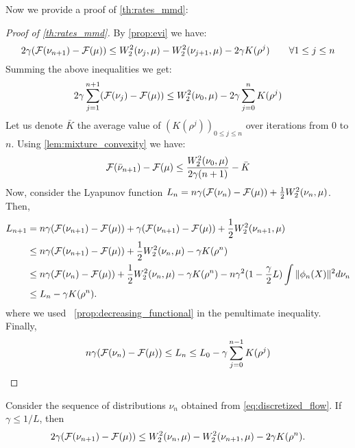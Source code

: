 Now we provide a proof of \cref{th:rates_mmd}:
\begin{proof}[Proof of \cref{th:rates_mmd}]\label{proof:th:rates_mmd}
	By \cref{prop:evi} we have:
	\[
	2\gamma({{\mathcal F}}(\nu_{n+1})-{{\mathcal F}}(\mu))
\leq 
W_2^2(\nu_j,\mu)-W_2^2(\nu_{j+1},\mu)-2\gamma K(\rho^j) \qquad \forall 1 \leq j\leq n 
	\]
	 Summing the above inequalities we get:
	\begin{align}
	2\gamma \sum_{j=1}^{n+1} ({{\mathcal F}}(\nu_{j}) - {{\mathcal F}}(\mu)) \leq W_2^2(\nu_0,\mu) - 2\gamma \sum_{j=0}^n K(\rho^j)
	\end{align}
	Let us denote $\bar{K}$ the average value of $(K(\rho^j))_{0\leq j \leq n}$ over iterations from $0$ to $n$. Using \cref{lem:mixture_convexity} we have:
	\begin{align}
	{{\mathcal F}}(\bar{\nu}_{n+1})-{{\mathcal F}}(\mu)\leq  \frac{W_2^2(\nu_0,\mu)}{2 \gamma (n+1)} -\bar{K}
	\end{align}
	Now, consider the Lyapunov function $L_n = n \gamma ({{\mathcal F}}(\nu_n) - {{\mathcal F}}(\mu)) + \frac12 W_2^2(\nu_n,\mu)$. Then,
	\begin{align*}
	L_{n+1} &= n\gamma({{\mathcal F}}(\nu_{n+1}) - {{\mathcal F}}(\mu)) + \gamma({{\mathcal F}}(\nu_{n+1}) - {{\mathcal F}}(\mu)) + \frac12 W_2^2(\nu_{n+1},\mu)\\
	&\leq n\gamma({{\mathcal F}}(\nu_{n+1}) - {{\mathcal F}}(\mu)) + \frac12 W_2^2(\nu_n,\mu)-\gamma K(\rho^n)\\
	&\leq n\gamma({{\mathcal F}}(\nu_{n}) - {{\mathcal F}}(\mu)) + \frac12 W_2^2(\nu_n,\mu)-\gamma K(\rho^n) -n\gamma^2 (1-\frac{\gamma}{2}L )\int \Vert \phi_n(X)\Vert^2 d\nu_n \\
	&\leq  L_n - \gamma K(\rho^n).
	\end{align*}
	where we used ~\cref{prop:decreasing_functional} in the penultimate inequality.
	Finally, 
	\begin{equation}
	n\gamma ({{\mathcal F}}(\nu_{n}) - {{\mathcal F}}(\mu)) \leq L_n \leq L_0 -\gamma \sum_{j = 0}^{n-1} K(\rho^j)
	\end{equation}
\end{proof}

\begin{proposition}\label{prop:evi}
	Consider the sequence of distributions $\nu_n$ obtained from \cref{eq:discretized_flow}. If $\gamma \leq 1/L$, then
	\begin{align}
2\gamma({{\mathcal F}}(\nu_{n+1})-{{\mathcal F}}(\mu))
\leq 
W_2^2(\nu_n,\mu)-W_2^2(\nu_{n+1},\mu)-2\gamma K(\rho^n).
\label{eq:evi}
\end{align}
\end{proposition}


